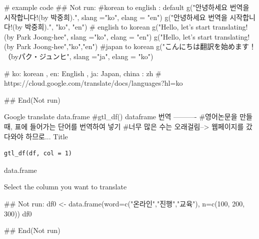 \documentclass[a4paper]{book}
\begin{document}
%
\begin{Examples}
\begin{ExampleCode}
# example code
\#\# Not run: 
#korean to english : default
g("안녕하세요 번역을 시작합니다!(by 박중희).", slang ="ko", elang = "en")
g("안녕하세요 번역을 시작합니다!(by 박중희).", "ko", "en")
# english to korean
g("Hello, let’s start translating! (by Park Joong-hee", slang ="ko", elang = "en")
g("Hello, let’s start translating! (by Park Joong-hee","ko","en")
#japan to korean
g("こんにちは翻訳を始めます！（byパク・ジュンヒ", slang ="ja", elang = "ko")

# ko: korean , en: English , ja: Japan, china : zh
# https://cloud.google.com/translate/docs/languages?hl=ko

## End(Not run)
\end{ExampleCode}
\end{Examples}
%
\begin{Description}
Google translate data.frame
\#gtl\_df() dataframe 번역 ----------
\#영어논문을 만들 때, 표에 들어가는 단어를 번역하여 넣기
\#너무 많은 수는 오래걸림--> 웹페이지를 갔다와야 하므로...
Title
\end{Description}
%
\begin{Usage}
\begin{verbatim}
gtl_df(df, col = 1)
\end{verbatim}
\end{Usage}
%
\begin{Arguments}
\begin{ldescription}
\item[\code{df}] data.frame

\item[\code{col}] Select the column you want to translate
\end{ldescription}
\end{Arguments}
%
\begin{Examples}
\begin{ExampleCode}
\#\# Not run: 
 df0 <-  data.frame(word=c("온라인","진행","교육"),
                   n=c(100, 200, 300))
 df0 %

## End(Not run)


\end{ExampleCode}
\end{Examples}
\end{document}
